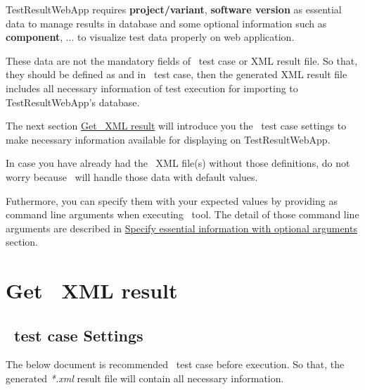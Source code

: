 



TestResultWebApp requires \textbf{project/variant}, \textbf{software version}
as essential data to manage results in database and some optional information 
such as \textbf{component}, ... to visualize test data properly on web application.

These data are not the mandatory fields of \rfwcore\ test case or XML result file.
So that, they should be defined as  and \rcode{[Tags]} in 
\rfwcore\ test case, then the generated XML result file includes all necessary 
information of test execution for importing to TestResultWebApp's database.

The next section \hyperref[description-get-robotframework-xml-result]
{Get \rfwcore\ XML result} will introduce you the \rfwcore\ test case settings 
to make necessary information available for displaying on TestResultWebApp.

In case you have already had the \rfwcore\ XML file(s) without those 
definitions, do not worry because \pkg\ will handle those data with default values.

Futhermore, you can specify them with your expected values by providing as 
command line arguments when executing \pkg\ tool. The detail of those command 
line arguments are described in \hyperref[optional-arguments]
{Specify essential information with optional arguments} section.

\hypertarget{description-get-robotframework-xml-result}{%
\section{Get \rfwcore\ XML result}
\label{description-get-robotframework-xml-result}}

  \hypertarget{description-robotframework-testcase-settings}{%
  \subsection{\rfwcore\ test case Settings}
  \label{description-robotframework-testcase-settings}}
    The below document is recommended \rfwcore\ test case 
    before execution.
    So that, the generated \emph{*.xml} result file will contain all necessary 
    information.

